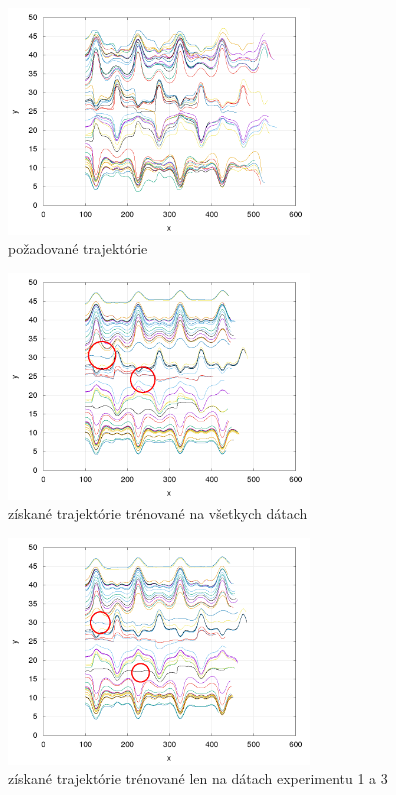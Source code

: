 \documentclass[10pt,a4paper]{article}
\begin{document}
\begin{figure}[!ht]
\centering
\includegraphics[width=8cm]{images/prediction_required.png}
\caption{požadované trajektórie}
\label{img:required_trajectory}
\end{figure}


\begin{figure}[!ht]
\centering
\includegraphics[width=8cm]{images/prediction_resulted_errors.png}
\caption{získané trajektórie trénované na všetkych dátach}
\label{img:resulted_trajectory_all}
\end{figure}


\begin{figure}[!ht]
\centering
\includegraphics[width=8cm]{images/prediction_resulted_50_errors.png}
\caption{získané trajektórie trénované len na dátach experimentu 1 a 3}
\label{img:resulted_trajectory}
\end{figure}
\end{document}
